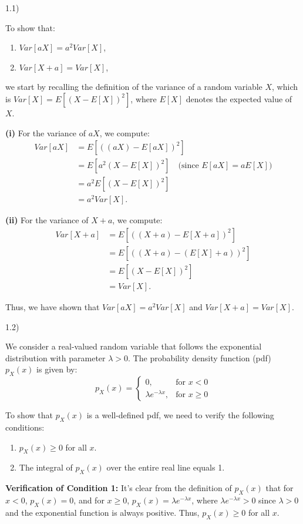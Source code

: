 \documentclass{article}
\begin{document}
1.1)

To show that:
\begin{enumerate}
    \item \(Var[aX] = a^2 Var[X]\),
    \item \(Var[X + a] = Var[X]\),
\end{enumerate}
we start by recalling the definition of the variance of a random variable \(X\), which is \(Var[X] = E[(X - E[X])^2]\), where \(E[X]\) denotes the expected value of \(X\).

\textbf{(i)} For the variance of \(aX\), we compute:
\begin{align*}
Var[aX] &= E[((aX) - E[aX])^2] \\
&= E[a^2(X - E[X])^2] \quad \text{(since \(E[aX] = aE[X]\))} \\
&= a^2 E[(X - E[X])^2] \\
&= a^2 Var[X].
\end{align*}

\textbf{(ii)} For the variance of \(X + a\), we compute:
\begin{align*}
Var[X + a] &= E[((X + a) - E[X + a])^2] \\
&= E[((X + a) - (E[X] + a))^2] \\
&= E[(X - E[X])^2] \\
&= Var[X].
\end{align*}

Thus, we have shown that \(Var[aX] = a^2 Var[X]\) and \(Var[X + a] = Var[X]\).


1.2)

We consider a real-valued random variable that follows the exponential distribution with parameter \(\lambda > 0\). The probability density function (pdf) \(p_X(x)\) is given by:
\[ p_X(x) = \begin{cases} 
0, & \text{for } x < 0 \\
\lambda e^{-\lambda x}, & \text{for } x \geq 0
\end{cases} \]

To show that \(p_X(x)\) is a well-defined pdf, we need to verify the following conditions:
\begin{enumerate}
    \item \(p_X(x) \geq 0\) for all \(x\).
    \item The integral of \(p_X(x)\) over the entire real line equals 1.
\end{enumerate}

\textbf{Verification of Condition 1:}
It's clear from the definition of \(p_X(x)\) that for \(x < 0\), \(p_X(x) = 0\), and for \(x \geq 0\), \(p_X(x) = \lambda e^{-\lambda x}\), where \(\lambda e^{-\lambda x} > 0\) since \(\lambda > 0\) and the exponential function is always positive. Thus, \(p_X(x) \geq 0\) for all \(x\).
\end{document}
